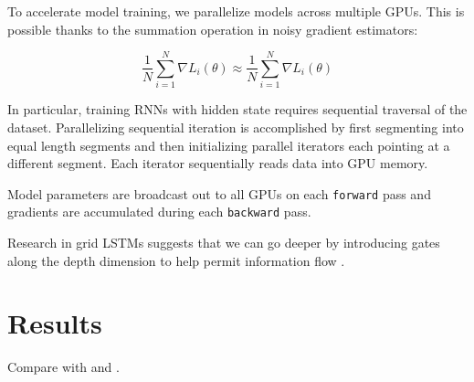 \documentclass[dissertation.tex]{subfiles}
\begin{document}
To accelerate model training, we parallelize models across multiple GPUs. This is possible
thanks to the summation operation in noisy gradient estimators:

\begin{equation}
  \frac{1}{N} \sum_{i=1}^N \nabla L_i(\theta) \approx \frac{1}{N} \sum_{i=1}^N \nabla L_i(\theta)
\end{equation}

In particular, training RNNs with hidden state requires sequential traversal
of the dataset. Parallelizing sequential iteration is accomplished by first segmenting
into equal length segments and then initializing parallel iterators each
pointing at a different segment. Each iterator sequentially reads data
into GPU memory.

Model parameters are broadcast out to all GPUs on each \texttt{forward} pass
and gradients are accumulated during each \texttt{backward} pass.

Research in grid LSTMs suggests that we can go deeper by introducing
gates along the depth dimension to help permit information flow .

\section{Results}

Compare with \cite{Allan2005} and \cite{Brien2016}.

\printbibliography
\end{document}
